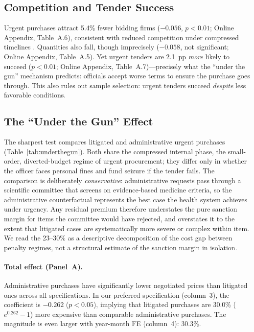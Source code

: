 \subsection{Competition and Tender Success}
\label{sec:competition}

Urgent purchases attract 5.4\% fewer bidding firms ($-0.056$, $p < 0.01$; Online Appendix, Table~A.6), consistent with reduced competition under compressed timelines \citep{bulow1996auctions}. Quantities also fall, though imprecisely ($-0.058$, not significant; Online Appendix, Table~A.5). Yet urgent tenders are 2.1~pp \emph{more} likely to succeed ($p < 0.01$; Online Appendix, Table~A.7)---precisely what the ``under the gun'' mechanism predicts: officials accept worse terms to ensure the purchase goes through. This also rules out sample selection: urgent tenders succeed \emph{despite} less favorable conditions.

\subsection{The ``Under the Gun'' Effect}
\label{sec:utg}

The sharpest test compares litigated and administrative urgent purchases (Table~\ref{tab:underthegun}). Both share the compressed internal phase, the small-order, diverted-budget regime of urgent procurement; they differ only in whether the officer faces personal fines and fund seizure if the tender fails. The comparison is deliberately \emph{conservative}: administrative requests pass through a scientific committee that screens on evidence-based medicine criteria, so the administrative counterfactual represents the best case the health system achieves under urgency. Any residual premium therefore understates the pure sanction margin for items the committee would have rejected, and overstates it to the extent that litigated cases are systematically more severe or complex within item. We read the 23--30\% as a descriptive decomposition of the cost gap between penalty regimes, not a structural estimate of the sanction margin in isolation.



\paragraph{Total effect (Panel~A).}
Administrative purchases have significantly lower negotiated prices than litigated ones across all specifications. In our preferred specification (column~3), the coefficient is $-0.262$ ($p < 0.05$), implying that litigated purchases are 30.0\% ($e^{0.262}-1$) more expensive than comparable administrative purchases. The magnitude is even larger with year-month FE (column~4): 30.3\%.

